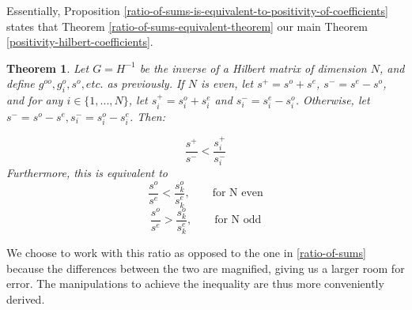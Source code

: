 \documentclass[11pt]{article}
\newtheorem{thm}{Theorem}[section]
\theoremstyle{definition}
\theoremstyle{remark}
\numberwithin{equation}{section}
\begin{document}
Essentially, Proposition \ref{ratio-of-sums-is-equivalent-to-positivity-of-coefficients} states that Theorem \ref{ratio-of-sums-equivalent-theorem} our main Theorem \ref{positivity-hilbert-coefficients}.

\begin{thm}\label{ratio-of-absolute-difference-theorem}
Let $G=H^{-1}$ be the inverse of a Hilbert matrix of dimension $N$, and define $g^{oo}, g_i^o, s^o, etc.$ as previously. If $N$ is even, let $s^+ = s^o + s^e$, $s^- = s^e-s^o$, and for any $i\in \{1,...,N\}$, let $s_i^+ = s_i^o + s_i^e$ and $s_i^- = s_i^e- s_i^o$. Otherwise, let $s^- = s^o - s^e, s_i^- = s_i^o - s_i^e$. Then:

\begin{equation}\label{ratio-of-absolute-difference-inequality}
\frac{s^+}{s^-} < \frac{s_i^+}{s_i^-} 
\end{equation} Furthermore, this is equivalent to 
\[ \frac{s^o}{s^e} < \frac{s^o_k}{s^e_k}, \qquad \text{for N even} \]
\[ \frac{s^o}{s^e} > \frac{s^o_k}{s^e_k}, \qquad \text{for N odd} \]
\end{thm}  We choose to work with this ratio as opposed to the one in \ref{ratio-of-sums} because the differences between the two are magnified, giving us a larger room for error. The manipulations to achieve the inequality are thus more conveniently derived. 
\end{document}
